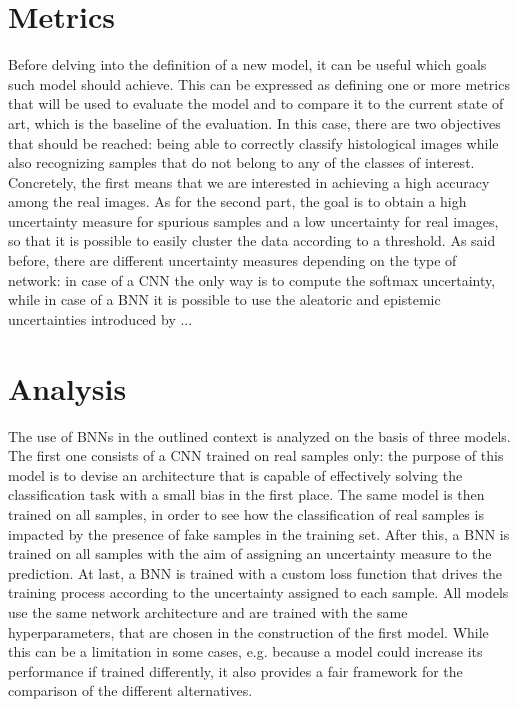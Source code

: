 \documentclass[11pt,twoside,a4paper]{article}
\begin{document}
\section{Metrics}
\label{sec:metrics}
Before delving into the definition of a new model, it can be useful which goals such model should achieve. This can be expressed as defining one or more metrics that will be used to evaluate the model and to compare it to the current state of art, which is the baseline of the evaluation.\newline
In this case, there are two objectives that should be reached: being able to correctly classify histological images while also recognizing samples that do not belong to any of the classes of interest. Concretely, the first means that we are interested in achieving a high accuracy among the real images. As for the second part, the goal is to obtain a high uncertainty measure for spurious samples and a low uncertainty for real images, so that it is possible to easily cluster the data according to a threshold.\newline
As said before, there are different uncertainty measures depending on the type of network: in case of a CNN the only way is to compute the softmax uncertainty, while in case of a BNN it is possible to use the aleatoric and epistemic uncertainties introduced by ...

\section{Analysis}
\label{sec:analysis}
The use of BNNs in the outlined context is analyzed on the basis of three models. The first one consists of a CNN trained on real samples only: the purpose of this model is to devise an architecture that is capable of effectively solving the classification task with a small bias in the first place. The same model is then trained on all samples, in order to see how the classification of real samples is impacted by the presence of fake samples in the training set. After this, a BNN is trained on all samples with the aim of assigning an uncertainty measure to the prediction. At last, a BNN is trained with a custom loss function that drives the training process according to the uncertainty assigned to each sample.\newline
All models use the same network architecture and are trained with the same hyperparameters, that are chosen in the construction of the first model. While this can be a limitation in some cases, e.g. because a model could increase its performance if trained differently, it also provides a fair framework for the comparison of the different alternatives.
\end{document}
